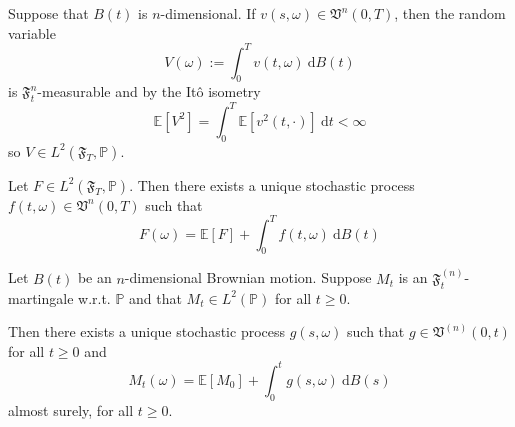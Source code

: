 Suppose that $B(t)$ is $n$-dimensional. If $v(s, \omega) \in \mathfrak{V}^n(0,T)$, then the random variable
\begin{equation*}
    V(\omega) := \int_0^T v(t, \omega) ~\mathrm{d}B(t)
\end{equation*}
is $\mathfrak{F}_t^n$-measurable and by the Itô isometry
\begin{equation*}
    \mathbb{E}[V^2] = \int_0^T \mathbb{E}[v^2(t, \cdot)] ~\mathrm{d}t < \infty
\end{equation*}
so $V \in L^2(\mathfrak{F}_T, \mathbb{P})$.

\begin{theorem}
    Let $F \in L^2(\mathfrak{F}_T, \mathbb{P})$. Then there exists a unique stochastic process $f(t, \omega) \in \mathfrak{V}^n(0, T)$ such that
    \begin{equation*}
        F(\omega) = \mathbb{E}[F] + \int_0^T f(t, \omega) ~\mathrm{d}B(t)
    \end{equation*}
\end{theorem}

\begin{theorem}
    Let $B(t)$ be an $n$-dimensional Brownian motion. Suppose $M_t$ is an $\mathfrak{F}_t^{(n)}$-martingale w.r.t. $\mathbb{P}$ and that $M_t \in L^2(\mathbb{P})$ for all $t \geq 0$.

    Then there exists a unique stochastic process $g(s, \omega)$ such that $g \in \mathfrak{V}^{(n)}(0, t)$ for all $t \geq 0$ and 
    \begin{equation*}
        M_t(\omega) = \mathbb{E}[M_0] + \int_0^t g(s, \omega) ~\mathrm{d}B(s)
    \end{equation*}
    almost surely, for all $t \geq 0$.
\end{theorem}